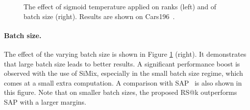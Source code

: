 \begin{figure}
\clearpage{}
\vspace{-3.0em}
\caption{The effect of sigmoid temperature  applied on ranks (left) and of batch size (right). Results are shown on Cars196~\cite{ksd+13}.}
\label{fig:ab_tau1_bs}
\vspace{-1.0em}
\end{figure}



\paragraph{Batch size.}
The effect of the varying batch size is shown in Figure \ref{fig:ab_tau1_bs} (right). It demonstrates that large batch size leads to better results. A significant performance boost is observed with the use of SiMix, especially in the small batch size regime, which comes at a small extra computation. A comparison with SAP~\cite{bxk+20} is also shown in this figure. Note that on smaller batch sizes, the proposed RS@k outperforms SAP with a larger margins.